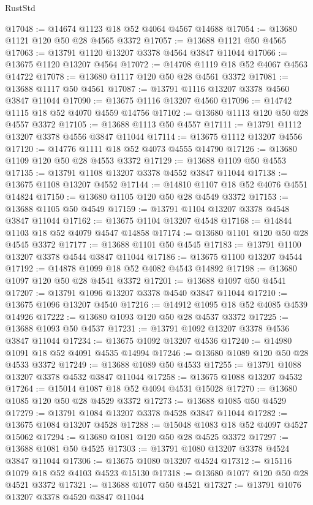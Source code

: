 \begin{lexlean}{RustStd}
\begin{coremodule}
@17048 := @14674 @1123 @18 @52 @4064 @4567 @14688
@17054 := @13680 @1121 @120 @50 @28 @4565 @3372
@17057 := @13688 @1121 @50 @4565
@17063 := @13791 @1120 @13207 @3378 @4564 @3847 @11044
@17066 := @13675 @1120 @13207 @4564
@17072 := @14708 @1119 @18 @52 @4067 @4563 @14722
@17078 := @13680 @1117 @120 @50 @28 @4561 @3372
@17081 := @13688 @1117 @50 @4561
@17087 := @13791 @1116 @13207 @3378 @4560 @3847 @11044
@17090 := @13675 @1116 @13207 @4560
@17096 := @14742 @1115 @18 @52 @4070 @4559 @14756
@17102 := @13680 @1113 @120 @50 @28 @4557 @3372
@17105 := @13688 @1113 @50 @4557
@17111 := @13791 @1112 @13207 @3378 @4556 @3847 @11044
@17114 := @13675 @1112 @13207 @4556
@17120 := @14776 @1111 @18 @52 @4073 @4555 @14790
@17126 := @13680 @1109 @120 @50 @28 @4553 @3372
@17129 := @13688 @1109 @50 @4553
@17135 := @13791 @1108 @13207 @3378 @4552 @3847 @11044
@17138 := @13675 @1108 @13207 @4552
@17144 := @14810 @1107 @18 @52 @4076 @4551 @14824
@17150 := @13680 @1105 @120 @50 @28 @4549 @3372
@17153 := @13688 @1105 @50 @4549
@17159 := @13791 @1104 @13207 @3378 @4548 @3847 @11044
@17162 := @13675 @1104 @13207 @4548
@17168 := @14844 @1103 @18 @52 @4079 @4547 @14858
@17174 := @13680 @1101 @120 @50 @28 @4545 @3372
@17177 := @13688 @1101 @50 @4545
@17183 := @13791 @1100 @13207 @3378 @4544 @3847 @11044
@17186 := @13675 @1100 @13207 @4544
@17192 := @14878 @1099 @18 @52 @4082 @4543 @14892
@17198 := @13680 @1097 @120 @50 @28 @4541 @3372
@17201 := @13688 @1097 @50 @4541
@17207 := @13791 @1096 @13207 @3378 @4540 @3847 @11044
@17210 := @13675 @1096 @13207 @4540
@17216 := @14912 @1095 @18 @52 @4085 @4539 @14926
@17222 := @13680 @1093 @120 @50 @28 @4537 @3372
@17225 := @13688 @1093 @50 @4537
@17231 := @13791 @1092 @13207 @3378 @4536 @3847 @11044
@17234 := @13675 @1092 @13207 @4536
@17240 := @14980 @1091 @18 @52 @4091 @4535 @14994
@17246 := @13680 @1089 @120 @50 @28 @4533 @3372
@17249 := @13688 @1089 @50 @4533
@17255 := @13791 @1088 @13207 @3378 @4532 @3847 @11044
@17258 := @13675 @1088 @13207 @4532
@17264 := @15014 @1087 @18 @52 @4094 @4531 @15028
@17270 := @13680 @1085 @120 @50 @28 @4529 @3372
@17273 := @13688 @1085 @50 @4529
@17279 := @13791 @1084 @13207 @3378 @4528 @3847 @11044
@17282 := @13675 @1084 @13207 @4528
@17288 := @15048 @1083 @18 @52 @4097 @4527 @15062
@17294 := @13680 @1081 @120 @50 @28 @4525 @3372
@17297 := @13688 @1081 @50 @4525
@17303 := @13791 @1080 @13207 @3378 @4524 @3847 @11044
@17306 := @13675 @1080 @13207 @4524
@17312 := @15116 @1079 @18 @52 @4103 @4523 @15130
@17318 := @13680 @1077 @120 @50 @28 @4521 @3372
@17321 := @13688 @1077 @50 @4521
@17327 := @13791 @1076 @13207 @3378 @4520 @3847 @11044

\end{coremodule}
\end{lexlean}
